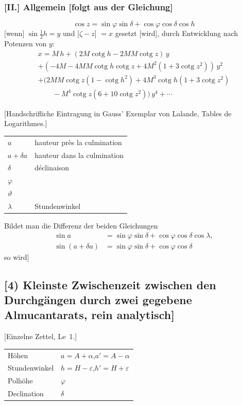 \documentclass[12pt,a4paper]{article}
\theoremstyle{plain}
\theoremstyle{definition}
\theoremstyle{remark}
\DeclareMathOperator{\cotg}{cotg}
\begin{document}
\subsubsection*{[II.] Allgemein [folgt aus der Gleichung]}

\[
\cos z = \sin\varphi \sin\delta + \cos\varphi \cos\delta \cos h
\]
[wenn] $\sin\tfrac{1}{2}h = y$ und [$\zeta - z$] $= x$ gesetzt [wird], durch Entwicklung nach Potenzen von $y$:
\begin{multline*}
x = M\,h + (2M\cotg h - 2MM\cotg z)\,y \\
+ (-4M - 4MM\cotg h\cotg z + 4M^2(1 + 3\cotg z^2))\,y^2 \\
+ (2MM\cotg z(1 - \cotg h^2) + 4M^3\cotg h(1 + 3\cotg z^2) \\
\qquad - M^4\cotg z(6 + 10\cotg z^2))\,y^4 + \cdots
\end{multline*}

[Handschrifliche Eintragung in Gauss' Exemplar von Lalande, Tables de Logarithmes.]

\begin{center}
\begin{tabular}{l@{ $=$ }l}
$a$ & hauteur pr\`{e}s la culmination \\
$a + \delta a$ & hauteur dans la culmination \\
$\delta$ & d\'{e}clinaison \\
$\varphi$ & \\
$\vartheta$ & \\
$\lambda$ & Stundenwinkel
\end{tabular}
\end{center}

Bildet man die Differenz der beiden Gleichungen
\begin{align*}
\sin a &= \sin\varphi \sin\delta + \cos\varphi \cos\delta \cos\lambda, \\
\sin(a + \delta a) &= \sin\varphi \sin\delta + \cos\varphi \cos\delta
\end{align*}
so wird]

\newpage

\subsection*{[4) Kleinste Zwischenzeit zwischen den Durchg\"angen durch zwei gegebene Almucantarats, rein analytisch]}

[Einzelne Zettel, Le~1.]

\begin{center}
\begin{tabular}{l@{ $=$ }l}
H\"ohen & $a = A + \alpha$,\quad $a' = A - \alpha$ \\
Stundenwinkel & $h = H - \varepsilon$,\quad $h' = H + \varepsilon$ \\
Polh\"ohe & $\varphi$ \\
Declination & $\delta$
\end{tabular}
\end{center}
\end{document}
